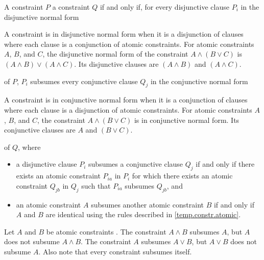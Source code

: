 \documentclass{wg21}
\begin{document}
\pnum
A constraint $P$  a constraint $Q$
if and only if,
for every disjunctive clause $P_i$
in the disjunctive normal form
\begin{wfootnote}
    A constraint is in disjunctive normal form when it is a disjunction of
    clauses where each clause is a conjunction of atomic constraints.
    For atomic constraints $A$, $B$, and $C$, the disjunctive normal form
    of the constraint
    $A \land (B \lor C)$
    is
    $(A \land B) \lor (A \land C)$.
    Its disjunctive clauses are $(A \land B)$ and $(A \land C)$.
\end{wfootnote}
of $P$, $P_i$ subsumes every conjunctive clause $Q_j$
in the conjunctive normal form
\begin{wfootnote}
    A constraint is in conjunctive normal form when it is a conjunction
    of clauses where each clause is a disjunction of atomic constraints.
    For atomic constraints $A$, $B$, and $C$, the constraint
    $A \land (B \lor C)$ is in conjunctive normal form.
    Its conjunctive clauses are $A$ and $(B \lor C)$.
\end{wfootnote}
of $Q$, where
\begin{itemize}
    \item
    a disjunctive clause $P_i$ subsumes a conjunctive clause $Q_j$ if and only
    if there exists an atomic constraint $P_{ia}$ in $P_i$ for which there exists
    an atomic constraint $Q_{jb}$ in $Q_j$ such that $P_{ia}$ subsumes $Q_{jb}$, and

    \item an atomic constraint $A$ subsumes another atomic constraint
    $B$ if and only if $A$ and $B$ are identical using the
    rules described in \ref{temp.constr.atomic}.



\end{itemize}
%
\begin{example}
    Let $A$ and $B$ be atomic constraints .
    The constraint $A \land B$ subsumes $A$, but $A$ does not subsume $A \land B$.
    The constraint $A$ subsumes $A \lor B$, but $A \lor B$ does not subsume $A$.
    Also note that every constraint subsumes itself.
\end{example}
\end{document}
